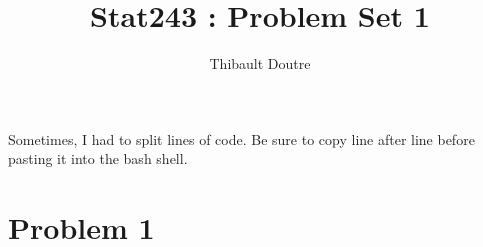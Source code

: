 \documentclass{llncs}\usepackage[]{graphicx}\usepackage[]{color}
\begin{document}
\title{Stat243 : Problem Set 1}
%
\author{Thibault Doutre}
%
%

\maketitle              %
Sometimes, I had to split lines of code. Be sure to copy line after line before pasting it into the bash shell. 


\section{Problem 1}
\end{document}
